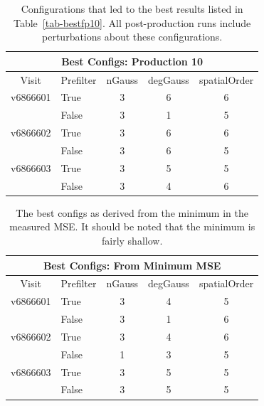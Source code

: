 \documentclass[prd, nofootinbib, floatfix, 11pt,tightenlines,times]{article}
\begin{document}
\begin{table}
\centering
\begin{tabular}{clccc}
\hline
\multicolumn{5}{|c|}{Best Configs: Production 10} \\
\hline
Visit    & Prefilter & nGauss & degGauss & spatialOrder \\
\hline
v6866601 & True      & 3      & 6        & 6 \\
         & False     & 3      & 1        & 5 \\
v6866602 & True      & 3      & 6        & 6 \\
         & False     & 3      & 6        & 5 \\
v6866603 & True      & 3      & 5        & 5 \\
         & False     & 3      & 4        & 6 \\
\end{tabular}
\caption{Configurations that led to the best results listed in
  Table~\ref{tab-bestfp10}.  All post-production runs include
  perturbations about these configurations. \label{tab-bestconfig10}}
\end{table}

\clearpage

\begin{table}
\centering
\begin{tabular}{clccc}
\hline
\multicolumn{5}{|c|}{Best Configs: From Minimum MSE} \\
\hline
Visit    & Prefilter & nGauss & degGauss & spatialOrder \\
\hline
v6866601 & True      & 3      & 4        & 5 \\
         & False     & 3      & 1        & 6 \\
v6866602 & True      & 3      & 4        & 6 \\
         & False     & 1      & 3        & 5 \\
v6866603 & True      & 3      & 5        & 5 \\
         & False     & 3      & 5        & 5 \\
\end{tabular}
\caption{The best configs as derived from the minimum in the measured MSE.  It should 
be noted that the minimum is fairly shallow.
\label{tab-bestconfig_MSE}}
\end{table}

\clearpage
\end{document}
